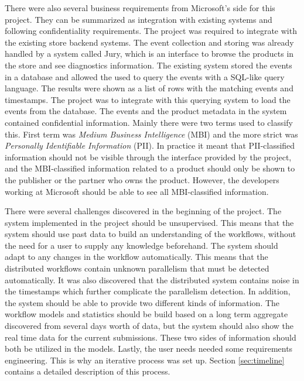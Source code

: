
There were also several business requirements from Microsoft's side for this project. They can be summarized as integration with existing systems and following confidentiality requirements. 
The project was required to integrate with the existing store backend systems. 
The event collection and storing was already handled by a system called Jury, which is an interface to browse the products in the store and see diagnostics information.
The existing system stored the events in a database and allowed the used to query the events with a SQL-like query language. The results were shown as a list of rows with the matching events and timestamps. The project was to integrate with this querying system to load the events from the database.
The events and the product metadata in the system contained confidential information. Mainly there were two terms used to classify this. First term was \textit{Medium Business Intelligence} (MBI) and the more strict was \textit{Personally Identifiable Information} (PII). In practice it meant that PII-classified information should not be visible through the interface provided by the project, and the MBI-classified information related to a product should only be shown to the publisher or the partner who owns the product. However, the developers working at Microsoft should be able to see all MBI-classified information.


There were several challenges discovered in the beginning of the project.
The system implemented in the project should be unsupervised.
This means that the system should use past data to build an understanding of the workflows, without the need for a user to supply any knowledge beforehand.
The system should adapt to any changes in the workflow automatically.
This means that the distributed workflows contain unknown parallelism that must be detected automatically.
It was also discovered that the distributed system contains noise in the timestamps which further complicate the parallelism detection.
In addition, the system should be able to provide two different kinds of information. The workflow models and statistics should be build based on a long term aggregate discovered from several days worth of data, but the system should also show the real time data for the current submissions.
These two sides of information should both be utilized in the models.
Lastly, the user needs needed some requirements engineering. This is why an iterative process was set up. Section \ref{sec:timeline} contains a detailed description of this process.

